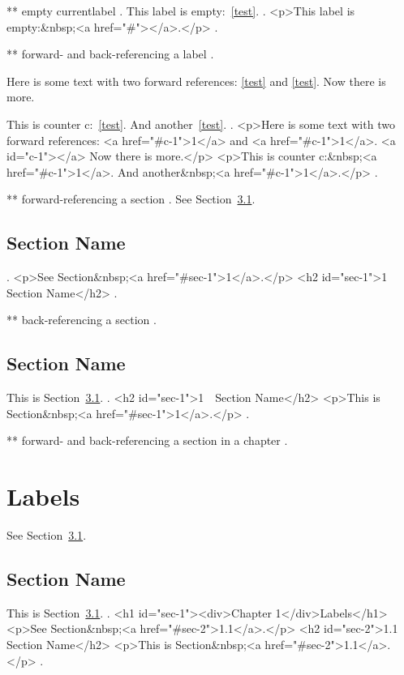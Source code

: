 ** empty currentlabel
.
This\label{test} label is empty:~\ref{test}.
.
<p>This label is empty:&nbsp;<a href="#"></a>.</p>
.


** forward- and back-referencing a label
.

Here is some text with two forward references: \ref{test} and \ref{test}.
Now there is more.

This \label{test} is counter c:~\ref{test}. And another~\ref{test}.
.
<p>Here is some text with two forward references: <a href="#c-1">1</a> and <a href="#c-1">1</a>. <a id="c-1"></a> Now there is more.</p>
<p>This  is counter c:&nbsp;<a href="#c-1">1</a>. And another&nbsp;<a href="#c-1">1</a>.</p>
.


** forward-referencing a section
.
See Section~\ref{sec:test}.

\section{Section Name}
\label{sec:test}
.
<p>See Section&nbsp;<a href="#sec-1">1</a>.</p>
<h2 id="sec-1">1 Section Name</h2>
.


** back-referencing a section
.
\section{Section Name}

This \label{sec:test} is Section~\ref{sec:test}.
.
<h2 id="sec-1">1 Section Name</h2>
<p>This  is Section&nbsp;<a href="#sec-1">1</a>.</p>
.


** forward- and back-referencing a section in a chapter
.
\chapter{Labels}

See Section~\ref{sec:test}.

\section{Section Name}
\label{sec:test}
This is Section~\ref{sec:test}.
.
<h1 id="sec-1"><div>Chapter 1</div>Labels</h1>
<p>See Section&nbsp;<a href="#sec-2">1.1</a>.</p>
<h2 id="sec-2">1.1 Section Name</h2>
<p>This is Section&nbsp;<a href="#sec-2">1.1</a>.</p>
.


